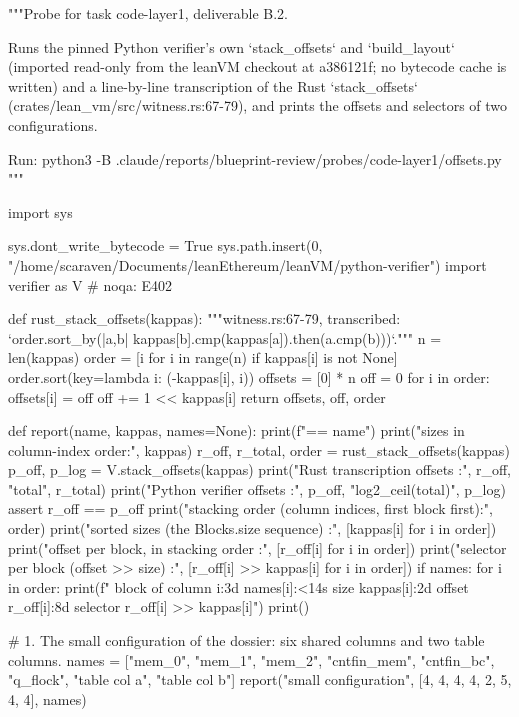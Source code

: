\begin{srccode}
"""Probe for task code-layer1, deliverable B.2.

Runs the pinned Python verifier's own `stack_offsets` and `build_layout` (imported read-only
from the leanVM checkout at a386121f; no bytecode cache is written) and a line-by-line
transcription of the Rust `stack_offsets` (crates/lean_vm/src/witness.rs:67-79), and prints
the offsets and selectors of two configurations.

Run:  python3 -B .claude/reports/blueprint-review/probes/code-layer1/offsets.py
"""

import sys

sys.dont_write_bytecode = True
sys.path.insert(0, "/home/scaraven/Documents/leanEthereum/leanVM/python-verifier")
import verifier as V  # noqa: E402


def rust_stack_offsets(kappas):
    """witness.rs:67-79, transcribed: `order.sort_by(|a,b| kappas[b].cmp(kappas[a]).then(a.cmp(b)))`."""
    n = len(kappas)
    order = [i for i in range(n) if kappas[i] is not None]
    order.sort(key=lambda i: (-kappas[i], i))
    offsets = [0] * n
    off = 0
    for i in order:
        offsets[i] = off
        off += 1 << kappas[i]
    return offsets, off, order


def report(name, kappas, names=None):
    print(f"== {name}")
    print("sizes in column-index order:", kappas)
    r_off, r_total, order = rust_stack_offsets(kappas)
    p_off, p_log = V.stack_offsets(kappas)
    print("Rust transcription offsets :", r_off, "total", r_total)
    print("Python verifier offsets    :", p_off, "log2_ceil(total)", p_log)
    assert r_off == p_off
    print("stacking order (column indices, first block first):", order)
    print("sorted sizes (the Blocks.size sequence)           :", [kappas[i] for i in order])
    print("offset per block, in stacking order               :", [r_off[i] for i in order])
    print("selector per block (offset >> size)               :", [r_off[i] >> kappas[i] for i in order])
    if names:
        for i in order:
            print(f"   block of column {i:3d} {names[i]:<14s} size {kappas[i]:2d} offset {r_off[i]:8d} selector {r_off[i] >> kappas[i]}")
    print()


# 1. The small configuration of the dossier: six shared columns and two table columns.
names = ["mem_0", "mem_1", "mem_2", "cntfin_mem", "cntfin_bc", "q_flock", "table col a", "table col b"]
report("small configuration", [4, 4, 4, 4, 2, 5, 4, 4], names)


\end{srccode}
